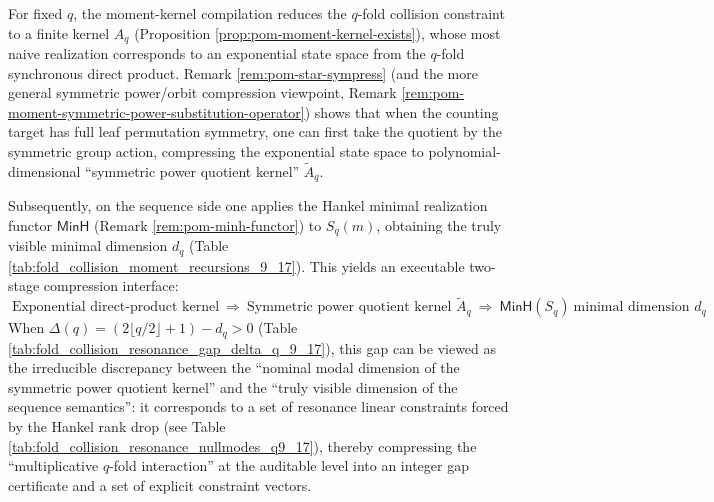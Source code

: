 \begin{remark}\label{rem:pom-sympower-then-minh}
For fixed \(q\), the moment-kernel compilation reduces the \(q\)-fold collision constraint to a finite kernel \(A_q\) (Proposition \ref{prop:pom-moment-kernel-exists}), whose most naive realization corresponds to an exponential state space from the \(q\)-fold synchronous direct product.
Remark \ref{rem:pom-star-sympress} (and the more general symmetric power/orbit compression viewpoint, Remark \ref{rem:pom-moment-symmetric-power-substitution-operator}) shows that when the counting target has full leaf permutation symmetry, one can first take the quotient by the symmetric group action, compressing the exponential state space to polynomial-dimensional ``symmetric power quotient kernel'' \(\widetilde A_q\).
\par
Subsequently, on the sequence side one applies the Hankel minimal realization functor \(\mathsf{MinH}\) (Remark \ref{rem:pom-minh-functor}) to \(S_q(m)\), obtaining the truly visible minimal dimension \(d_q\) (Table \ref{tab:fold_collision_moment_recursions_9_17}).
This yields an executable two-stage compression interface:
\[
\boxed{\;
\text{Exponential direct-product kernel}\ \Longrightarrow\ \text{Symmetric power quotient kernel }\widetilde A_q\ \Longrightarrow\ \mathsf{MinH}(S_q)\ \text{minimal dimension }d_q\; }.
\]
When \(\Delta(q)=(2\lfloor q/2\rfloor+1)-d_q>0\) (Table \ref{tab:fold_collision_resonance_gap_delta_q_9_17}),
this gap can be viewed as the irreducible discrepancy between the ``nominal modal dimension of the symmetric power quotient kernel'' and the ``truly visible dimension of the sequence semantics'':
it corresponds to a set of resonance linear constraints forced by the Hankel rank drop (see Table \ref{tab:fold_collision_resonance_nullmodes_q9_17}), thereby compressing the ``multiplicative \(q\)-fold interaction'' at the auditable level into an integer gap certificate and a set of explicit constraint vectors.
\end{remark}

